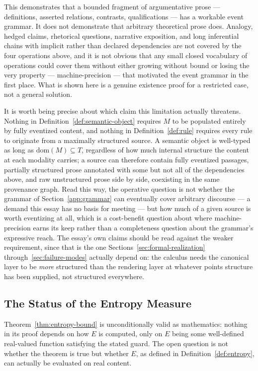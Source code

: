 \documentclass[11pt]{article}
\theoremstyle{definition}
\begin{document}
This demonstrates that a bounded fragment of argumentative prose --- definitions, asserted relations, contrasts, qualifications --- has a workable event grammar. It does not demonstrate that arbitrary theoretical prose does. Analogy, hedged claims, rhetorical questions, narrative exposition, and long inferential chains with implicit rather than declared dependencies are not covered by the four operations above, and it is not obvious that any small closed vocabulary of operations could cover them without either growing without bound or losing the very property --- machine-precision --- that motivated the event grammar in the first place. What is shown here is a genuine existence proof for a restricted case, not a general solution.

It is worth being precise about which claim this limitation actually threatens. Nothing in Definition~\ref{def:semantic-object} requires $M$ to be populated entirely by fully eventized content, and nothing in Definition~\ref{def:rule} requires every rule to originate from a maximally structured source. A semantic object is well-typed as long as $\mathrm{dom}(M) \subseteq T$, regardless of how much internal structure the content at each modality carries; a source can therefore contain fully eventized passages, partially structured prose annotated with some but not all of the dependencies above, and raw unstructured prose side by side, coexisting in the same provenance graph. Read this way, the operative question is not whether the grammar of Section~\ref{app:grammar} can eventually cover arbitrary discourse --- a demand this essay has no basis for meeting --- but how much of a given source is worth eventizing at all, which is a cost-benefit question about where machine-precision earns its keep rather than a completeness question about the grammar's expressive reach. The essay's own claims should be read against the weaker requirement, since that is the one Sections~\ref{sec:formal-realization} through~\ref{sec:failure-modes} actually depend on: the calculus needs the canonical layer to be \emph{more} structured than the rendering layer at whatever points structure has been supplied, not structured everywhere.

\subsection{The Status of the Entropy Measure}
\label{sec:entropy-status}

Theorem~\ref{thm:entropy-bound} is unconditionally valid as mathematics: nothing in its proof depends on how $E$ is computed, only on $E$ being some well-defined real-valued function satisfying the stated guard. The open question is not whether the theorem is true but whether $E$, as defined in Definition~\ref{def:entropy}, can actually be evaluated on real content.
\end{document}
